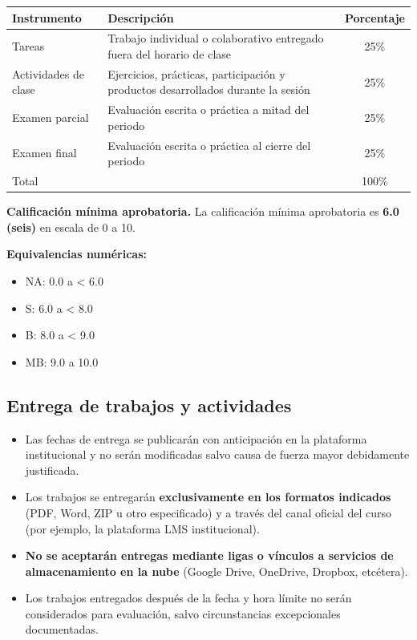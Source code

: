 \documentclass[12pt]{article}
\begin{document}
	\begin{center}
		\begin{tabular}{|l|p{7cm}|c|}
			\hline
			\textbf{Instrumento} & \textbf{Descripción} & \textbf{Porcentaje} \\
			\hline
			Tareas & Trabajo individual o colaborativo entregado fuera del horario de clase & 25\% \\
			\hline
			Actividades de clase & Ejercicios, prácticas, participación y productos desarrollados durante la sesión & 25\% \\
			\hline
			Examen parcial & Evaluación escrita o práctica a mitad del periodo & 25\% \\
			\hline
			Examen final & Evaluación escrita o práctica al cierre del periodo & 25\% \\
			\hline
			Total & & 100\% \\
			\hline
		\end{tabular}
	\end{center}
	
	\vspace{0.5em}
	
	\noindent\textbf{Calificación mínima aprobatoria.} La calificación mínima aprobatoria es \textbf{6.0 (seis)} en escala de 0 a 10.
	
	\noindent\textbf{Equivalencias numéricas:}
	\begin{itemize}
		\item NA: 0.0 a < 6.0
		\item S: 6.0 a < 8.0
		\item B: 8.0 a < 9.0
		\item MB: 9.0 a 10.0
	\end{itemize}
	
	\subsection*{Entrega de trabajos y actividades}
	
	\begin{itemize}
		\item Las fechas de entrega se publicarán con anticipación en la plataforma institucional y no serán modificadas salvo causa de fuerza mayor debidamente justificada.
		\item Los trabajos se entregarán \textbf{exclusivamente en los formatos indicados} (PDF, Word, ZIP u otro especificado) y a través del canal oficial del curso (por ejemplo, la plataforma LMS institucional).
		\item \textbf{No se aceptarán entregas mediante ligas o vínculos a servicios de almacenamiento en la nube} (Google Drive, OneDrive, Dropbox, etcétera).
		\item Los trabajos entregados después de la fecha y hora límite no serán considerados para evaluación, salvo circunstancias excepcionales documentadas.
	\end{itemize}
	
\end{document}
